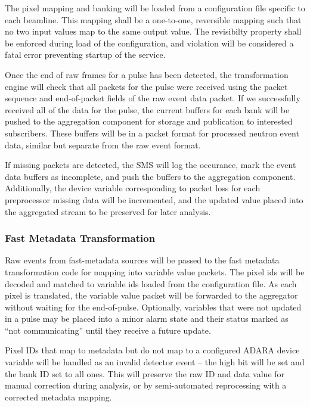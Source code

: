 The pixel mapping and banking will be loaded from a configuration file specific
to each beamline. This mapping shall be a one-to-one, reversible mapping such
that no two input values map to the same output value. The revisibilty property
shall be enforced during load of the configuration, and violation will be
considered a fatal error preventing startup of the service.

Once the end of raw frames for a pulse has been detected, the transformation
engine will check that all packets for the pulse were received using the
packet sequence and end-of-packet fields of the raw event data packet. If
we successfully received all of the data for the pulse, the current buffers
for each bank will be pushed to the aggregation component for storage and
publication to interested subscribers. These buffers will be in a packet format
for processed neutron event data, similar but separate from the raw event
format.

If missing packets are detected, the SMS will log the occurance, mark the
event data buffers as incomplete, and push the buffers to the aggregation
component. Additionally, the device variable corresponding to packet loss
for each preprocessor missing data will be incremented, and the updated
value placed into the aggregated stream to be preserved for later analysis.



\subsubsection{Fast Metadata Transformation}

Raw events from fast-metadata sources will be passed to the fast metadata
transformation code for mapping into variable value packets. The pixel ids will
be decoded and matched to variable ids loaded from the configuration file. As
each pixel is translated, the variable value packet will be forwarded to the
aggregator without waiting for the end-of-pulse. Optionally, variables that
were not updated in a pulse may be placed into a minor alarm state and their
status marked as ``not communicating'' until they receive a future update.

Pixel IDs that map to metadata but do not map to a configured ADARA device
variable will be handled as an invalid detector event -- the high bit will
be set and the bank ID set to all ones. This will preserve the raw ID and
data value for manual correction during analysis, or by semi-automated
reprocessing with a corrected metadata mapping.

